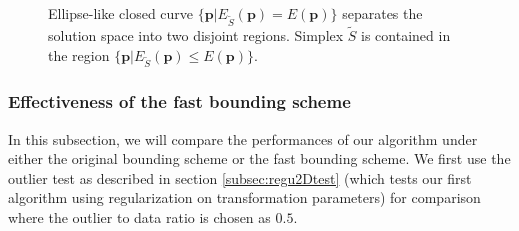 \documentclass[11pt,bezier,]{article}
\begin{document}
\begin{figure}[h]
\centering
\caption{Ellipse-like closed curve $\{\mathbf p|  E_{\widetilde S}(\mathbf p)= E(\mathbf p) \}$ 
separates the solution space into two disjoint regions.
Simplex $\widetilde S$ is contained in the region  $\{\mathbf p|  E_{\widetilde S}(\mathbf p)\le E(\mathbf p) \}$.
\label{ellipse}}
\end{figure}


\subsubsection{Effectiveness of the fast bounding scheme\label{new_bound_effect}}
In this subsection,
we will compare the performances of our algorithm under
either the original bounding scheme or the fast bounding scheme.
We first  use  the outlier test  as described in section \ref{subsec:regu2Dtest} 
(which tests our first algorithm using regularization on transformation parameters)
for comparison
where the outlier to data ratio is chosen as $0.5$.
%
\end{document}
